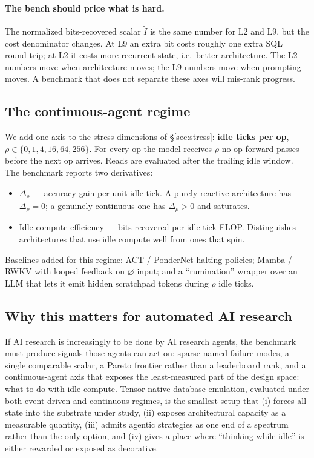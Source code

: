 \documentclass[11pt]{article}
\begin{document}
\paragraph{The bench should price what is hard.}
The normalized bits-recovered scalar $\tilde{I}$ is the same number for
L2 and L9, but the cost denominator changes. At L9 an extra bit costs
roughly one extra SQL round-trip; at L2 it costs more recurrent state,
i.e.\ better architecture. The L2 numbers move when architecture moves;
the L9 numbers move when prompting moves. A benchmark that does not
separate these axes will mis-rank progress.

\subsection{The continuous-agent regime}

We add one axis to the stress dimensions of \S\ref{sec:stress}:
\textbf{idle ticks per op}, $\rho \in \{0, 1, 4, 16, 64, 256\}$. For
every op the model receives $\rho$ no-op forward passes before the next
op arrives. Reads are evaluated after the trailing idle window. The
benchmark reports two derivatives:
\begin{itemize}[leftmargin=*]
  \item $\Delta_\rho$ --- accuracy gain per unit idle tick. A purely
    reactive architecture has $\Delta_\rho = 0$; a genuinely continuous
    one has $\Delta_\rho > 0$ and saturates.
  \item Idle-compute efficiency --- bits recovered per idle-tick FLOP.
    Distinguishes architectures that use idle compute well from ones
    that spin.
\end{itemize}

Baselines added for this regime: ACT / PonderNet halting policies;
Mamba / RWKV with looped feedback on $\varnothing$ input; and a
``rumination'' wrapper over an LLM that lets it emit hidden scratchpad
tokens during $\rho$ idle ticks.

\subsection{Why this matters for automated AI research}

If AI research is increasingly to be done by AI research agents, the
benchmark must produce signals those agents can act on: sparse named
failure modes, a single comparable scalar, a Pareto frontier rather
than a leaderboard rank, and a continuous-agent axis that exposes the
least-measured part of the design space: what to do with idle compute.
Tensor-native database emulation, evaluated under both event-driven
and continuous regimes, is the smallest setup that (i) forces all
state into the substrate under study, (ii) exposes architectural
capacity as a measurable quantity, (iii) admits agentic strategies as
one end of a spectrum rather than the only option, and (iv) gives a
place where ``thinking while idle'' is either rewarded or exposed as
decorative.
\end{document}

